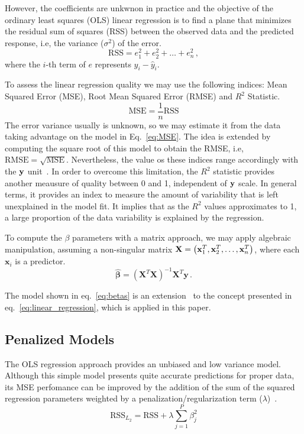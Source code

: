 However, the coefficients are unkwnon in practice and the objective of the ordinary least squares (OLS) linear regression is to find a plane that minimizes the residual sum of squares (RSS) between the observed data and the predicted response, i.e, the variance ($\sigma^2$) of the error.     
\begin{equation}
  \text{RSS} = e_1^2 + e_2^2 + \dots + e_n^2 \, , \label{eq:RSS}
\end{equation}
where the $i$-th term of $e$ represents $y_i - \hat{y}_i$.

To assess the linear regression quality we may use the following indices: Mean Squared Error (MSE), Root Mean Squared Error (RMSE) and $R^2$ Statistic.
\begin{equation}
  \text{MSE} = \frac{1}{n} \text{RSS}
  \label{eq:MSE}
\end{equation}
The error variance usually is unknown, so we may estimate it from the data taking advantage on the model in Eq.~\ref{eq:MSE}. The idea is extended by computing the square root of this model to obtain the RMSE, i.e, $\text{RMSE} = \sqrt{\text{MSE}}$. Nevertheless, the value os these indices range accordingly with the ${\bf y}$ unit~\cite{Kuhn2013}. In order to overcome this limitation, the $R^2$ statistic provides another meausure of quality between 0 and 1, independent of ${\bf y}$ scale. In general terms, it provides an index to measure the amount of variability that is left unexplained in the model fit. It implies that as the $R^2$ values approximates to 1, a large proportion of the data variability is explained by the regression.

To compute the $\beta$ parameters with a matrix approach, we may apply algebraic manipulation, assuming a non-singular matrix ${\bf X} = \left( \mathbf{x}_1^T, \mathbf{x}_2^T, \dots,\mathbf{x}_n^T \right)$, where each $\mathbf{x}_i$ is a predictor. 
\begin{equation}
\mathbf{\hat{\boldsymbol{\beta}}} = \left( \mathbf{X}^T\mathbf{X}  \right)^{-1}\mathbf{X}^T \mathbf{y} \, . \label{eq:betas}
\end{equation}

The model shown in eq.~\ref{eq:betas} is an extension~\cite{Kuhn2013} to the concept presented in eq.~\ref{eq:linear_regression}, which is applied in this paper.



\subsection{Penalized Models}
The OLS regression approach provides an unbiased and low variance model. Although this simple model presents quite accurate predictions for proper data, its MSE perfomance can be improved by the addition of the sum of the squared regression parameters weighted by a penalization/regularization term ($\lambda$)~\cite{Kuhn2013}.
\begin{equation}
  \text{RSS}_{L_2} = \text{RSS} + \lambda \sum_{j = 1}^{P} \beta_{j}^2
  \label{eq:ridge}
\end{equation}


